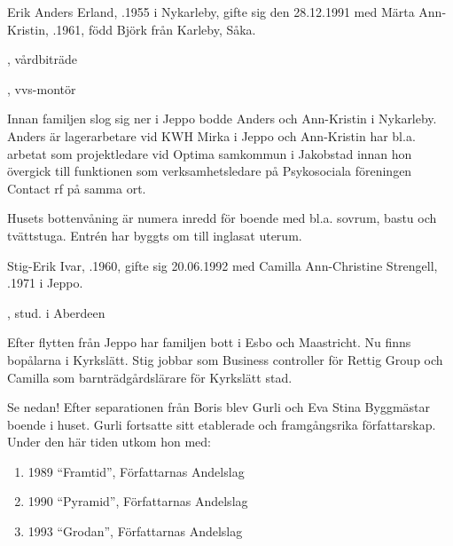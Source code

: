 


Erik Anders Erland, .1955 i Nykarleby, gifte sig den 28.12.1991 med Märta Ann-Kristin, .1961, född Björk från Karleby, Såka.
\begin{jhchildren}
  \item {}, vårdbiträde
  \item {}, vvs-montör
\end{jhchildren}

Innan familjen slog sig ner i Jeppo bodde Anders och Ann-Kristin i Nykarleby. Anders är lagerarbetare vid KWH Mirka i Jeppo och Ann-Kristin har bl.a. arbetat som projektledare vid Optima samkommun i Jakobstad innan hon övergick till funktionen som verksamhetsledare på Psykosociala föreningen Contact rf på samma ort.

Husets bottenvåning är numera inredd för boende med bl.a. sovrum, bastu och tvättstuga. Entrén har byggts om till inglasat uterum.


Stig-Erik Ivar, .1960, gifte sig 20.06.1992 med Camilla Ann-Christine Strengell, .1971 i Jeppo.
\begin{jhchildren}
  \item {}, stud. i Aberdeen
  \item {}
  \item {}
  \item {}
\end{jhchildren}

Efter flytten från Jeppo har familjen bott i Esbo och Maastricht. Nu finns bopålarna i Kyrkslätt. Stig jobbar som Business controller för Rettig Group och Camilla som barnträdgårdslärare för Kyrkslätt stad.


Se nedan! Efter separationen från Boris blev Gurli och Eva Stina Byggmästar	boende i huset. Gurli fortsatte sitt etablerade och framgångsrika författarskap. Under den här tiden utkom hon med:
\begin{enumerate}
  \item 1989	``Framtid'', Författarnas Andelslag
  \item 1990	``Pyramid'', Författarnas Andelslag
  \item 1993	``Grodan'', Författarnas Andelslag
\end{enumerate}


